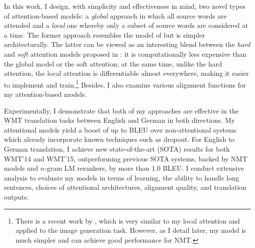 In this work, I design, with simplicity and effectiveness in mind, two novel
types of attention-based models: a {\it global} approach in which all source
words are attended and a {\it local} one whereby only a subset of source words
are considered at a time. The former approach resembles the model of
\cite{bog15} but is simpler architecturally. The latter can be viewed as an
interesting blend between the {\it hard} and {\it soft} attention models
proposed in \cite{xu15}: it is computationally less expensive than the
global model or the soft attention; at the same time, unlike the hard attention,
the local attention is
differentiable almost everywhere, making it easier to implement and
train.\footnote{There is a recent work by , which is very
similar to my local attention and applied to the image generation task.
However, as I detail later, my model is much simpler and can achieve good performance for NMT.} Besides, I also examine various
alignment functions for my attention-based models.

Experimentally, I demonstrate that both of my approaches are
effective in the WMT translation tasks between English and German in  both
directions. My attentional models yield a boost of up to \attngain{} BLEU over
non-attentional systems which already incorporate known techniques such as
dropout. For English to German translation, I achieve new state-of-the-art
(SOTA)
results for both WMT'14 and WMT'15, outperforming previous SOTA systems, backed by
NMT models and $n$-gram LM rerankers, by more than 1.0 BLEU. I conduct
extensive analysis to evaluate my models in terms of learning, the ability to
handle long sentences, choices of attentional architectures, alignment quality, and translation
outputs. 
